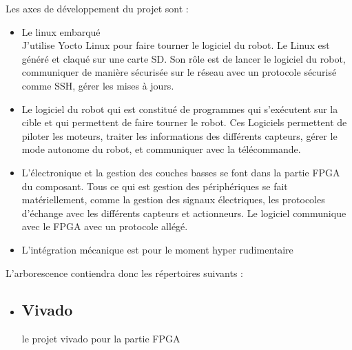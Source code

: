 Les axes de développement du projet sont : 
\begin{itemize}
\item  Le linux embarqué
\\J'utilise Yocto Linux pour faire tourner le logiciel du robot. Le Linux est généré et claqué sur une carte SD.
Son rôle est de lancer le logiciel du robot, communiquer de manière sécurisée sur le réseau avec un protocole sécurisé comme SSH, gérer les mises à jours.

\item Le logiciel du robot qui est constitué de programmes qui s'exécutent sur la cible et qui permettent de faire tourner le robot.
Ces Logiciels permettent de piloter les moteurs, traiter les informations des différents capteurs, gérer le mode autonome du robot, et communiquer avec la télécommande.
\item L'électronique et la gestion des couches basses se font dans la partie FPGA du composant.
Tous ce qui est gestion des périphériques se fait matériellement, comme la gestion des signaux électriques, les protocoles d'échange avec les différents capteurs et actionneurs.
Le logiciel communique avec le FPGA avec un protocole allégé.

\item L'intégration mécanique est pour le moment hyper rudimentaire

\end{itemize}




L'arborescence contiendra donc les répertoires suivants : 




\begin{itemize}


\item 


\subsection{Vivado}
 le projet vivado pour la partie FPGA

\end{itemize}



 